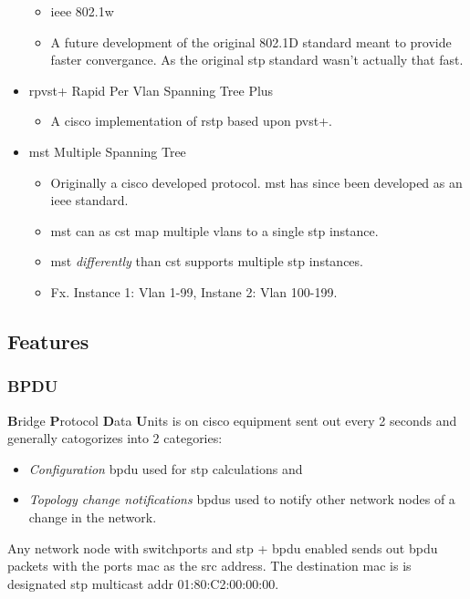 \begin{itemize}
    \begin{itemize}
        \item \gls{ieee} 802.1w
        \item A future development of the original 802.1D standard meant to provide faster convergance. As the original \gls{stp} standard wasn't actually that fast.
    \end{itemize}
    \item \gls{rpvst+} {\scriptsize Rapid Per Vlan Spanning Tree Plus}
    \begin{itemize}
        \item A cisco implementation of \gls{rstp} based upon \gls{pvst+}.
    \end{itemize}
    \item \gls{mst} {\scriptsize Multiple Spanning Tree}
    \begin{itemize}
        \item Originally a cisco developed protocol. \gls{mst} has since been developed as an \gls{ieee} standard.
        \item \gls{mst} can as \gls{cst} map multiple vlans to a single \gls{stp} instance.
        \item \gls{mst} \textit{differently} than \gls{cst} supports multiple \gls{stp} instances.
        \item Fx. Instance 1: Vlan 1-99, Instane 2: Vlan 100-199.
    \end{itemize}
\end{itemize}

\subsection{Features}

\subsubsection{BPDU}
\textbf{B}ridge \textbf{P}rotocol \textbf{D}ata \textbf{U}nits is on cisco equipment sent out every 2 seconds and generally catogorizes into 2 categories:
\begin{itemize}
    \item \textit{Configuration} \gls{bpdu} used for \gls{stp} calculations and
    \item \textit{Topology change notifications} \gls{bpdu}s used to notify other network nodes of a change in the network.
\end{itemize}

Any network node with switchports and \gls{stp} + \gls{bpdu} enabled sends out \gls{bpdu} packets with the ports \gls{mac} as the src address. The destination \gls{mac} is is designated \gls{stp} multicast addr 01:80:C2:00:00:00.

